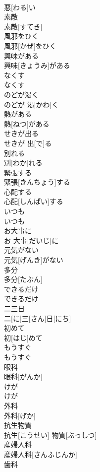\documentclass[8pt]{extreport}
\begin{document}
\begin{CJK}{UTF8}{min}
\\	悪[わる]い
\\	素敵	
\\	素敵[すてき]
\\	風邪をひく	
\\	風邪[かぜ]をひく
\\	興味がある	
\\	興味[きょうみ]がある
\\	なくす	
\\	なくす
\\	のどが渇く	
\\	のどが 渇[かわ]く
\\	熱がある	
\\	熱[ねつ]がある
\\	せきが出る	
\\	せきが 出[で]る
\\	別れる	
\\	別[わか]れる
\\	緊張する	
\\	緊張[きんちょう]する
\\	心配する	
\\	心配[しんぱい]する
\\	いつも	
\\	いつも
\\	お大事に	
\\	お 大事[だいじ]に
\\	元気がない	
\\	元気[げんき]がない
\\	多分	
\\	多分[たぶん]
\\	できるだけ	
\\	できるだけ
\\	二三日	
\\	二[に]三[さん]日[にち]
\\	初めて	
\\	初[はじ]めて
\\	もうすぐ	
\\	もうすぐ
\\	眼科	
\\	眼科[がんか]
\\	けが	
\\	けが
\\	外科	
\\	外科[げか]
\\	抗生物質	
\\	抗生[こうせい] 物質[ぶっしつ]
\\	産婦人科	
\\	産婦人科[さんふじんか]
\\	歯科	

\end{CJK}
\end{document}
